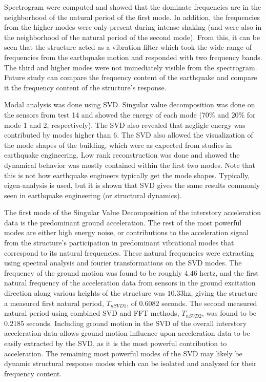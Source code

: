 \documentclass{article}
\begin{document}
\medskip

Spectrogram were computed and showed that the dominate frequencies are in the neighborhood of the natural period of the first mode. In addition, the frequencies from the higher modes were only present during intense shaking (and were also in the neighborhood of the natural period of the second mode). From this, it can be seen that the structure acted as a vibration filter which took the wide range of frequencies from the earthquake motion and responded with two frequency bands. The third and higher modes were not immediately visible from the spectrogram. Future study can compare the frequency content of the earthquake and compare it the frequency content of the structure's response.

\medskip

Modal analysis was done using SVD. Singular value decomposition was done on the sensors from test 14 and showed the energy of each mode
(70\% and 20\% for mode 1 and 2, respectively). The SVD also revealed that negligle energy was contributed by modes higher than 6.
The SVD also allowed the visualization of the mode shapes of the building, which were as expected from studies in earthquake engineering.
Low rank reconstruction was done and showed the dynamical behavior was mostly contained within the first two modes. Note that this is not how earthquake engineers typically get the mode shapes. Typically, eigen-analysis is used, but it is shown that SVD gives the same results commonly seen in earthquake engineering (or structural dynamics).

\medskip

The first mode of the Singular Value Decomposition of the interstory acceleration data is the predominant ground acceleration. The rest of the most powerful modes are either high energy noise, or contributions to the acceleration signal from the structure’s participation in predominant vibrational modes that correspond to its natural frequencies. These natural frequencies were extracting using spectral analysis and fourier transformations on the SVD modes. The frequency of the ground motion was found to be roughly $4.46$ hertz, and the first natural frequency of the acceleration data from sensors in the ground excitation direction along various heights of the structure was $10.33 $hz, giving the structure a measured first natural period, $T_{nSVD1}$, of $0.6082$ seconds. The second measured natural period using combined SVD and FFT methods, $T_{nSVD2}$, was found to be $0.2185$ seconds.  Including ground motion in the SVD of the overall interstory acceleration data allows ground motion influence upon acceleration data to be easily extracted by the SVD, as it is the most powerful contribution to acceleration. The remaining most powerful modes of the SVD may likely be dynamic structural response modes which can be isolated and analyzed for their frequency content.
\end{document}
